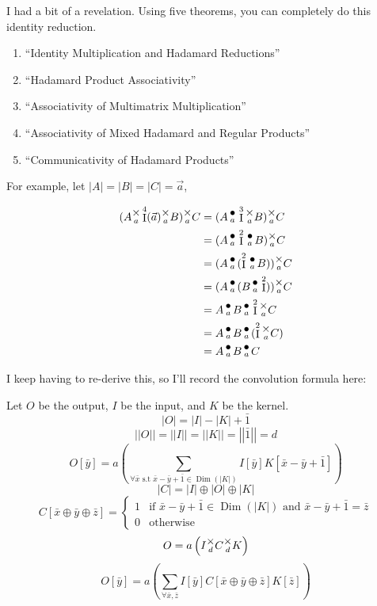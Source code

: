 \documentclass[12pt]{book}
\theoremstyle{plain}
\theoremstyle{definition}
\theoremstyle{ppart}
\theoremstyle{case}
\theoremstyle{solution}
\DeclareMathOperator{\Dim}{Dim}
\DeclareMathOperator{\Ident}{I}
\newcommand{\mmult}[1]{\text{\raisebox{1ex}{$\underset{#1}{\times}$}}}
\newcommand{\dmult}[1]{\text{\raisebox{1ex}{$\underset{#1}{\,\bullet\,}$}}}
\newcommand{\shape}[1]{\left|#1\right|}
\begin{document}
\begin{appendices}
I had a bit of a revelation. Using five theorems, you can completely do this identity reduction.

\begin{enumerate}
\item ``Identity Multiplication and Hadamard Reductions''
\item ``Hadamard Product Associativity''
\item ``Associativity of Multimatrix Multiplication''
\item ``Associativity of Mixed Hadamard and Regular Products''
\item ``Communicativity of Hadamard Products''
\end{enumerate}

For example, let $\shape{A} = \shape{B} = \shape{C} = \vec{a}$,

\begin{align*}
  (A \mmult{a} \Ident^4(\vec{a}) \mmult{a} B) \mmult{a} C
  &=
  (A \dmult{a} \Ident^3 \mmult{a} B) \mmult{a} C \\
  &=
  (A \dmult{a} \Ident^2 \dmult{a} B) \mmult{a} C \\
  &=
  (A \dmult{a} (\Ident^2 \dmult{a} B)) \mmult{a} C \\
  &=
  (A \dmult{a} (B \dmult{a} \Ident^2)) \mmult{a} C \\
  &=
  A \dmult{a} B \dmult{a} \Ident^2 \mmult{a} C \\
  &=
  A \dmult{a} B \dmult{a} (\Ident^2 \mmult{a} C) \\
  &=
  A \dmult{a} B \dmult{a} C
\end{align*}

\pagebreak

I keep having to re-derive this, so I'll record the convolution formula here:

Let $O$ be the output, $I$ be the input, and $K$ be the kernel. 
\[ \shape{O} = \shape{I} - \shape{K} + \bar{1} \]
\[ \shape{\shape{O}} = \shape{\shape{I}} = \shape{\shape{K}} = \shape{\shape{\bar{1}}} = d \]
\[
  O[\bar{y}] =
  a\left(
    \sum_{\forall \bar{x} \text{ s.t } \bar{x}-\bar{y}+\bar{1} \in \Dim(\shape{K})} 
    I[\bar{y}] K[\bar{x}-\bar{y}+\bar{1}]
  \right)
\]
\[ \shape{C} = \shape{I} \oplus \shape{O} \oplus \shape{K} \]
\[
  C[\bar{x} \oplus \bar{y} \oplus \bar{z}] = 
  \left\{
    \begin{array}{ll}
      1  & \mbox{if } \bar{x}-\bar{y}+\bar{1} \in \Dim(\shape{K}) \mbox{ and } \bar{x}-\bar{y}+\bar{1}=\bar{z} \\
      0 & \mbox{otherwise}
    \end{array}
  \right.
\]
\[ O = a\left( I \mmult{d} C \mmult{d} K \right) \]
\[
  O[\bar{y}] =
  a\left(
    \sum_{\forall \bar{x}, \bar{z}}
      I[\bar{y}]
      C[\bar{x} \oplus \bar{y} \oplus \bar{z}]
      K[\bar{z}]
  \right)
\]


\end{appendices}
\end{document}
